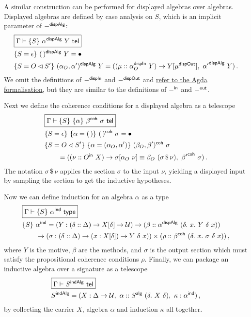 A similar construction can be performed for displayed algebras over algebras.
Displayed algebras are defined by case analysis on $S$, which is an implicit parameter of $-^{\textsf{dispAlg}}$:
\begin{align*}
&\boxed{\Gamma \vdash \{S\}\ \alpha\D\ Y \tel} \\
& \{S = \epsilon\}\ (\,)\D\ Y = \bullet \\
&\{S = O \lhd S'\}\ (\alpha_O, \alpha')\D\ Y = ((\mu :: \alpha_O\DI\ Y) \to Y[\mu\DO],\ {\alpha'}\D\ Y) \,.
\end{align*}
We omit the definitions of $-^{\textsf{dispIn}}$ and $-^{\textsf{dispOut}}$ and
\href{https://github.com/kontheocharis/rep-agda/blob/e6bd34adaab630f5787c63a95fa86869f6c19da4/TT/Sig.agda\#L107}{refer to the Agda formalisation},
but they are similar to
the definitions of $-^{\textsf{in}}$ and $-^{\textsf{out}}$.

Next we define the coherence conditions for a displayed algebra as a telescope
\begin{align*}
&\boxed{\Gamma \vdash \{S\}\ \{\alpha\}\ \beta^{\textsf{coh}}\ \sigma \ \textsf{tel}} \\
& \{S = \epsilon\}\ \{\alpha = (\,)\}\ (\,)^{\textsf{coh}}\ \sigma = \bullet \\
& \{S = O \lhd S'\}\ \{\alpha = (\alpha_O, \alpha')\}\ (\beta_O, \beta')^{\textsf{coh}}\ \sigma \\
&\qquad = ((\nu :: O^{\textsf{in}}\ X) \to \sigma[\alpha_O\ \nu] \equiv \beta_O\ (\sigma \, \$ \, \nu),\  {\beta'}^{\textsf{coh}}\ \sigma) \,.
\end{align*}
The notation $\sigma \, \$\, \nu$ applies the section $\sigma$ to the input $\nu$,
yielding a displayed input by sampling the section to get the inductive
hypotheses.

Now we can define induction for an algebra $\alpha$ as a type
\begin{align*}
&\boxed{\Gamma \vdash \{S\}\ \alpha\IND \type} \\
&\{S\}\ \alpha\IND = (Y : (\delta :: \Delta) \to X[\delta] \to \univ) \to (\beta :: \alpha\D\ (\delta.\ x.\ Y\ \delta\ x)) \\
&\qquad\to (\sigma : (\delta :: \Delta) \to (x : X[\delta]) \to Y\ \delta\ x)) \times (\rho :: \beta\COH\ (\delta.\ x.\ \sigma\ \delta\ x)) \,,
\end{align*}
where $Y$ is the motive, $\beta$ are the methods, and $\sigma$ is the output section which must
satisfy the propositional coherence conditions $\rho$.
Finally, we can package an inductive algebra over a signature as a telescope
\begin{align*}
&\boxed{\Gamma \vdash S\INDA \tel} \\
&S\INDA = (X : \Delta \to \univ,\ \alpha :: S\A\ (\delta.\ X\ \delta),\ \kappa : \alpha\IND) \,,
\end{align*}
by collecting the carrier $X$, algebra $\alpha$ and induction $\kappa$ all together.

